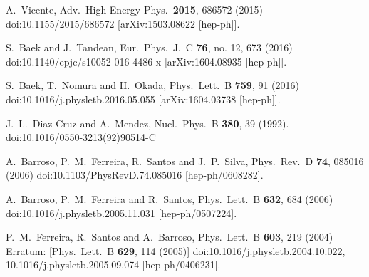 \documentclass[aps,prd,groupaddress,floatfix,tighten,nofootinbib,showpacs,
amsfonts,superscriptaddress]{revtex4}
\begin{document}
{\begin{thebibliography}{99}
  
  A.~Vicente,
  Adv.\ High Energy Phys.\  {\bf 2015}, 686572 (2015)
  doi:10.1155/2015/686572
  [arXiv:1503.08622 [hep-ph]].
  
  S.~Baek and J.~Tandean,
  Eur.\ Phys.\ J.\ C {\bf 76}, no. 12, 673 (2016)
  doi:10.1140/epjc/s10052-016-4486-x
  [arXiv:1604.08935 [hep-ph]].
  
  S.~Baek, T.~Nomura and H.~Okada,
  Phys.\ Lett.\ B {\bf 759}, 91 (2016)
  doi:10.1016/j.physletb.2016.05.055
  [arXiv:1604.03738 [hep-ph]].
  
  J.~L.~Diaz-Cruz and A.~Mendez,
  Nucl.\ Phys.\ B {\bf 380}, 39 (1992).
  doi:10.1016/0550-3213(92)90514-C
  
  A.~Barroso, P.~M.~Ferreira, R.~Santos and J.~P.~Silva,
  Phys.\ Rev.\ D {\bf 74}, 085016 (2006)
  doi:10.1103/PhysRevD.74.085016
  [hep-ph/0608282].
  
  A.~Barroso, P.~M.~Ferreira and R.~Santos,
  Phys.\ Lett.\ B {\bf 632}, 684 (2006)
  doi:10.1016/j.physletb.2005.11.031
  [hep-ph/0507224].
  
  P.~M.~Ferreira, R.~Santos and A.~Barroso,
  Phys.\ Lett.\ B {\bf 603}, 219 (2004)
  Erratum: [Phys.\ Lett.\ B {\bf 629}, 114 (2005)]
  doi:10.1016/j.physletb.2004.10.022, 10.1016/j.physletb.2005.09.074
  [hep-ph/0406231].
 

\end{thebibliography}}
\end{document}
